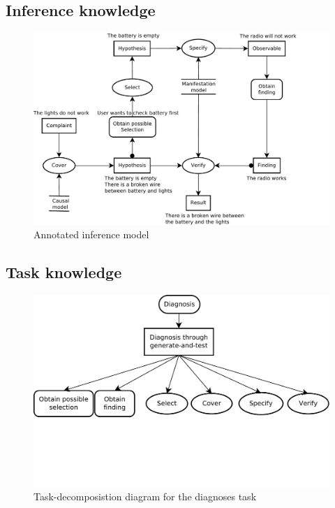 \documentclass[a4paper,10pt]{article}
\begin{document}
\subsection{Inference knowledge}
\begin{figure}[htbp]
	\centering
		\includegraphics[width=1.00\textwidth]{InferenceModel.pdf}
	\caption{Annotated inference model}
	\label{fig:InferenceModel}
\end{figure}


\subsection{Task knowledge}
\begin{figure}[htbp]
	\centering
		\includegraphics[width=1.00\textwidth, trim = 0 130 0 0, clip = true]{taskDecomposition.pdf}
	\caption{Task-decomposistion diagram for the diagnoses task}
	\label{fig:taskDecomposition}
\end{figure}
\end{document}
